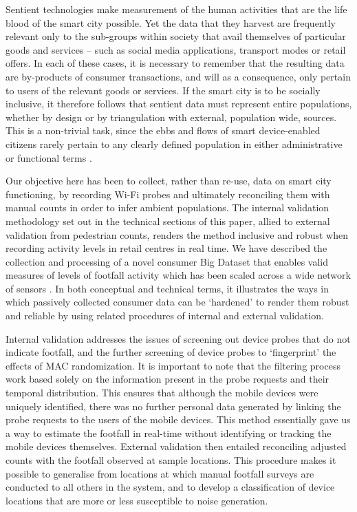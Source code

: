 Sentient technologies make measurement of the human activities that are the life
blood of the smart city possible. Yet the data that they harvest are frequently
relevant only to the sub-groups within society that avail themselves of
particular goods and services – such as social media applications, transport
modes or retail offers. In each of these cases, it is necessary to remember that
the resulting data are by-products of consumer transactions, and will as a
consequence, only pertain to users of the relevant goods or services. If the
smart city is to be socially inclusive, it therefore follows that sentient data
must represent entire populations, whether by design or by triangulation with
external, population wide, sources. This is a non-trivial task, since the ebbs
and flows of smart device-enabled citizens rarely pertain to any clearly defined
population in either administrative or functional terms
\citep{massam1975location}.

Our objective here has been to collect, rather than re-use, data on smart city
functioning, by recording Wi-Fi probes and ultimately reconciling them with
manual counts in order to infer ambient populations. The internal validation
methodology set out in the technical sections of this paper, allied to external
validation from pedestrian counts, renders the method inclusive and robust when
recording activity levels in retail centres in real time. We have described the
collection and processing of a novel consumer Big Dataset that enables valid
measures of levels of footfall activity which has been scaled across a wide
network of sensors \citep{cdrc2018consumer}.  In both conceptual and technical
terms, it illustrates the ways in which passively collected consumer data can be
‘hardened’ to render them robust and reliable by using related procedures of
internal and external validation.

Internal validation addresses the issues of screening out device probes that do
not indicate footfall, and the further screening of device probes to
‘fingerprint’ the effects of MAC randomization. It is important to note that the
filtering process work based solely on the information present in the probe
requests and their temporal distribution. This ensures that although the mobile
devices were uniquely identified, there was no further personal data generated
by linking the probe requests to the users of the mobile devices. This method
essentially gave us a way to estimate the footfall in real-time without
identifying or tracking the mobile devices themselves. External validation then
entailed reconciling adjusted counts with the footfall observed at sample
locations. This procedure makes it possible to generalise from locations at
which manual footfall surveys are conducted to all others in the system, and to
develop a classification of device locations that are more or less susceptible
to noise generation.

